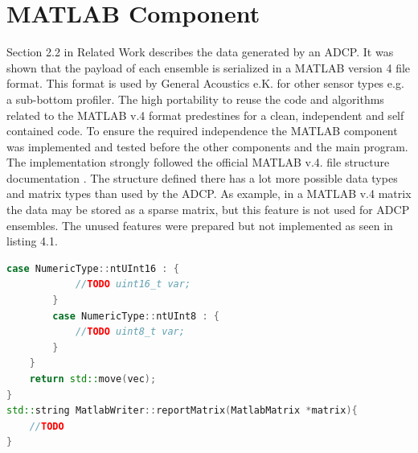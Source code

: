 \section{MATLAB Component}
Section 2.2 in Related Work describes the data generated by an ADCP. It was shown that the payload of each ensemble is serialized in a MATLAB version 4 file format. This format is used by General Acoustics e.K. for other sensor types e.g. a sub-bottom profiler. The high portability to reuse the code and algorithms related to the MATLAB v.4 format predestines for a clean, independent and self contained code. To ensure the required independence the MATLAB component was implemented and tested before the other components and the main program.\\
The implementation strongly followed the official MATLAB v.4. file structure documentation \cite{matlab}. The structure defined there has a lot more possible data types and matrix types than used by the ADCP. As example, in a MATLAB v.4 matrix the data may be stored as a sparse matrix, but this feature is not used for ADCP ensembles. The unused features were prepared but not implemented as seen in listing 4.1.
\begin{lstlisting}[language=C++, caption=Code snippet of not implemented logic]
        case NumericType::ntUInt16 : {
            //TODO uint16_t var;
        }
        case NumericType::ntUInt8 : {
            //TODO uint8_t var;
        }
    }
    return std::move(vec);
}
std::string MatlabWriter::reportMatrix(MatlabMatrix *matrix){
    //TODO
}
\end{lstlisting}

